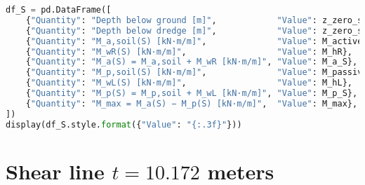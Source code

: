 \begin{lstlisting}[language=Python]
df_S = pd.DataFrame([
    {"Quantity": "Depth below ground [m]",            "Value": z_zero_shear},
    {"Quantity": "Depth below dredge [m]",            "Value": z_zero_shear - Z},
    {"Quantity": "M_a,soil(S) [kN·m/m]",              "Value": M_active},
    {"Quantity": "M_wR(S) [kN·m/m]",                  "Value": M_hR},
    {"Quantity": "M_a(S) = M_a,soil + M_wR [kN·m/m]", "Value": M_a_S},
    {"Quantity": "M_p,soil(S) [kN·m/m]",              "Value": M_passive},
    {"Quantity": "M_wL(S) [kN·m/m]",                  "Value": M_hL},
    {"Quantity": "M_p(S) = M_p,soil + M_wL [kN·m/m]", "Value": M_p_S},
    {"Quantity": "M_max = M_a(S) − M_p(S) [kN·m/m]",  "Value": M_max},
])
display(df_S.style.format({"Value": "{:.3f}"}))
\end{lstlisting}

\section{Shear line $t = 10.172$ meters}

